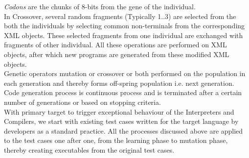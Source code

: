 \documentclass{sig-alternate}
\begin{document}
\indent \textit{Codons} are the chunks of 8-bits from the gene of the individual.\\
\indent In Crossover, several random fragments (Typically 1..3) are selected from the both the individuals by selecting common non-terminals from the corresponding XML objects. These selected fragments from one individual are exchanged with fragments of other individual. All these operations are performed on XML objects, after which new programs are generated from these modified XML objects.\\
\indent Genetic operators mutation or crossover or both performed on the population in each generation and thereby forms off-spring population i.e. next generation. Code generation process is continuous process and is terminated after a certain number of generations or based on stopping criteria. \\
\indent With primary target to trigger exceptional behaviour of the Interpreters and Compilers, we start with existing test cases written for the target language by developers as a standard practice. All the  processes discussed above are applied to the test cases one after one, from the learning phase to mutation phase, thereby creating executables from the original test cases.
\end{document}
